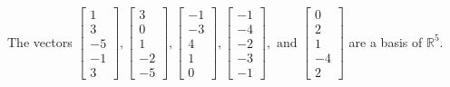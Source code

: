 \begin{exercise}
\begin{exerciseStatement}
  \end{exerciseStatement}
  \begin{exerciseAnswer}
   The vectors \(\left[\begin{array}{r}
1 \\
3 \\
-5 \\
-1 \\
3
\end{array}\right] , \left[\begin{array}{r}
3 \\
0 \\
1 \\
-2 \\
-5
\end{array}\right] , \left[\begin{array}{r}
-1 \\
-3 \\
4 \\
1 \\
0
\end{array}\right] , \left[\begin{array}{r}
-1 \\
-4 \\
-2 \\
-3 \\
-1
\end{array}\right] , \text{ and } \left[\begin{array}{r}
0 \\
2 \\
1 \\
-4 \\
2
\end{array}\right]\) 
  	 are  a basis of \(\mathbb{R}^5\).
  


  \end{exerciseAnswer}
\end{exercise}